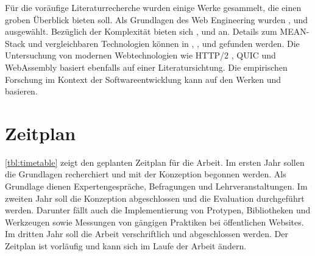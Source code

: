 Für die voräufige Literaturrecherche wurden einige Werke gesammelt, die einen groben Überblick bieten soll.
Als Grundlagen des Web Engineering wurden \cite{Pressman2000What}, \cite{Murugesan1999Web} und \cite{murugesan2001web} ausgewählt.
Bezüglich der Komplexität bieten sich \cite{cheng2006method}, \cite{johannsen2018progressive} und \cite{zagane2019evaluating} an.
Details zum MEAN-Stack und vergleichbaren Technologien können in \cite{dunka2018simplifying}, \cite{aggarwal2018comparative}, \cite{gomes2020teaching} und \cite{shabu2023development} gefunden werden.
Die Untersuchung von modernen Webtechnologien wie HTTP/2 \cite{zimmermann2017http,zimmermann2017qoe}, QUIC \cite{wolsing2019performance} und WebAssembly \cite{haas2017bringing,jangda2019not} basiert ebenfalls auf einer Literatursichtung.
Die empirischen Forschung im Kontext der Softwareentwicklung kann auf den Werken \cite{wohlin2012experimentation} und \cite{felderer2020contemporary} basieren.

\section*{Zeitplan}\label{sec:zeitplan}

\autoref{tbl:timetable} zeigt den geplanten Zeitplan für die Arbeit.
Im ersten Jahr sollen die Grundlagen recherchiert und mit der Konzeption begonnen werden.
Als Grundlage dienen Expertengespräche, Befragungen und Lehrveranstaltungen.
Im zweiten Jahr soll die Konzeption abgeschlossen und die Evaluation durchgeführt werden.
Darunter fällt auch die Implementierung von Protypen, Bibliotheken und Werkzeugen sowie Messungen von gängigen Praktiken bei öffentlichen Websites.
Im dritten Jahr soll die Arbeit verschriftlich und abgeschlossen werden.
Der Zeitplan ist vorläufig und kann sich im Laufe der Arbeit ändern.

